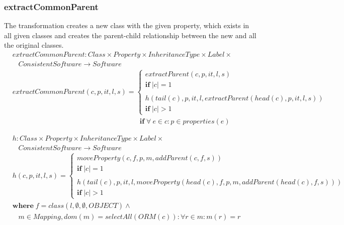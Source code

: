 \documentclass[10pt]{article}
\begin{document}
\subsubsection{extractCommonParent}
The transformation creates a new class with the given property, which exists in all given classes and creates the parent-child relationship between the new and all the original classes.
\begin{align}
& extractCommonParent: Class \times Property \times InheritanceType \times Label \times
\nonumber \\
& \;\;\; ConsistentSoftware \rightarrow Software \\
& extractCommonParent(c, p, it, l, s) = \begin{cases}
     extractParent(c, p, it, l, s) \\
     \mathbf{if} \; |c| = 1 \\\\
     h(tail(c), p, it, l, extractParent(head(c), p, it, l, s)) \\
       \mathbf{if} \; |c| > 1
 \end{cases} \\
& \;\;\;\;\;\;\;\;\;\;\;\;\;\;\;\;\;\;\;\;\;\;\;\;\;\;\;\;\;\;\;\;\;\;\;\;\;\;\;\;\;\;\;\;\;\;\;\;\;\;\;\;\;\;\;\;\;\;\;\;\;\;\;\;\; \mathbf{if} \; \forall \: e \in c : p \in properties(e)
\end{align}

\begin{align}
& h: Class \times Property \times InheritanceType \times Label \times
\nonumber \\
& \;\;\; ConsistentSoftware \rightarrow Software \\
& h(c, p, it, l, s) = \begin{cases}
    moveProperty(c, f, p, m, addParent(c, f, s)) \\
    \mathbf{if} \; |c| = 1 \\
   \\
    h(tail(c), p, it, l, moveProperty(head(c), f, p, m, addParent(head(c), f, s)))\\
    \mathbf{if} \; |c| > 1
 \end{cases} \nonumber \\
&   \mathbf{where} \; f = class(l, \emptyset, \emptyset, OBJECT) \land  \\
&    \;\;\; m \in Mapping, dom(m) = selectAll(ORM(c)) : \forall r \in m :  m(r) = r 
\end{align}
\end{document}
